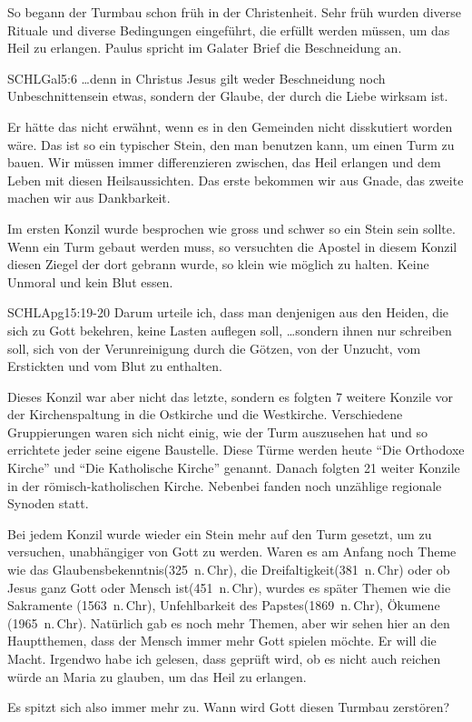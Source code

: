 \documentclass[12pt]{../../inc/mybib}
\newenvironment{block}[1][]{%
  \vspace{1.5em}%
  \noindent\textbf{#1}\par%
  \vspace{0.0em}%
}{%
  \vspace{1em}%
}
\begin{document}
\begin{block}
    So begann der Turmbau schon früh in der Christenheit. Sehr früh wurden diverse Rituale und diverse Bedingungen eingeführt, die erfüllt werden müssen, um das Heil zu erlangen. 
    Paulus spricht im Galater Brief die Beschneidung an.
    \begin{bibelbox}{SCHL}{Gal}{5:6}
        \dots denn in Christus Jesus gilt weder Beschneidung noch Unbeschnittensein etwas, sondern der Glaube, der durch die Liebe wirksam ist.
    \end{bibelbox}
    Er hätte das nicht erwähnt, wenn es in den Gemeinden nicht disskutiert worden wäre. Das ist so ein typischer Stein, den man benutzen kann, um einen Turm zu bauen. Wir müssen immer differenzieren zwischen, das Heil erlangen und dem Leben mit diesen Heilsaussichten. Das erste bekommen wir aus Gnade, das zweite machen wir aus Dankbarkeit.

    Im ersten Konzil wurde besprochen wie gross und schwer so ein Stein sein sollte. Wenn ein Turm gebaut werden muss, so versuchten die Apostel in diesem Konzil diesen Ziegel der dort gebrann wurde, so klein wie möglich zu halten. Keine Unmoral und kein Blut essen. 
    \begin{bibelbox}{SCHL}{Apg}{15:19-20}
        Darum urteile ich, dass man denjenigen aus den Heiden, die sich zu Gott bekehren, keine Lasten auflegen soll,
        \dots sondern ihnen nur schreiben soll, sich von der Verunreinigung durch die Götzen, von der Unzucht, vom Erstickten und vom Blut zu enthalten.
    \end{bibelbox}
    Dieses Konzil war aber nicht das letzte, sondern es folgten 7 weitere Konzile vor der Kirchenspaltung in die Ostkirche und die Westkirche. Verschiedene Gruppierungen waren sich nicht einig, wie der Turm auszusehen hat und so errichtete jeder seine eigene Baustelle. Diese Türme werden heute \enquote{Die Orthodoxe Kirche} und \enquote{Die Katholische Kirche} genannt. Danach folgten 21 weiter Konzile in der römisch-katholischen Kirche. Nebenbei fanden noch unzählige regionale Synoden statt.
    
    Bei jedem Konzil wurde wieder ein Stein mehr auf den Turm gesetzt, um zu versuchen, unabhängiger von Gott zu werden. Waren es am Anfang noch Theme wie das Glaubensbekenntnis(325~n.\,Chr), die Dreifaltigkeit(381~n.\,Chr) oder ob Jesus ganz Gott oder Mensch ist(451~n.\,Chr), wurdes es später Themen wie die Sakramente (1563~n.\,Chr), Unfehlbarkeit des Papstes(1869~n.\,Chr), Ökumene (1965~n.\,Chr). Natürlich gab es noch mehr Themen, aber wir sehen hier an den Hauptthemen, dass der Mensch immer mehr Gott spielen möchte. Er will die Macht.
    Irgendwo habe ich gelesen, dass geprüft wird, ob es nicht auch reichen würde an Maria zu glauben, um das Heil zu erlangen.
    
    Es spitzt sich also immer mehr zu. Wann wird Gott diesen Turmbau zerstören?
\end{block}
\end{document}
